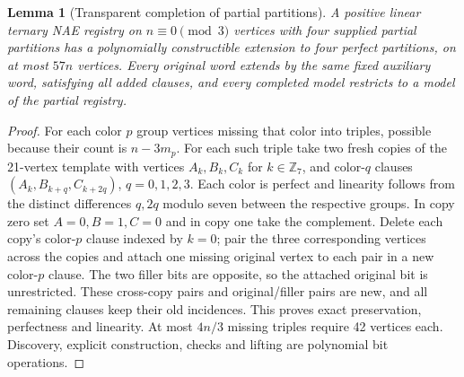 \documentclass[11pt]{article}
\newtheorem{lemma}[theorem]{Lemma}
\begin{document}
\begin{lemma}[Transparent completion of partial partitions]\label{lem:ds16-complete}
A positive linear ternary NAE registry on $n\equiv0\pmod3$ vertices with four supplied partial partitions has a polynomially constructible extension to four perfect partitions, on at most $57n$ vertices. Every original word extends by the same fixed auxiliary word, satisfying all added clauses, and every completed model restricts to a model of the partial registry.
\end{lemma}
\begin{proof}
For each color $p$ group vertices missing that color into triples, possible because their count is $n-3m_p$. For each such triple take two fresh copies of the 21-vertex template with vertices $A_k,B_k,C_k$ for $k\in\mathbb Z_7$, and color-$q$ clauses $(A_k,B_{k+q},C_{k+2q})$, $q=0,1,2,3$. Each color is perfect and linearity follows from the distinct differences $q,2q$ modulo seven between the respective groups. In copy zero set $A=0,B=1,C=0$ and in copy one take the complement. Delete each copy's color-$p$ clause indexed by $k=0$; pair the three corresponding vertices across the copies and attach one missing original vertex to each pair in a new color-$p$ clause. The two filler bits are opposite, so the attached original bit is unrestricted. These cross-copy pairs and original/filler pairs are new, and all remaining clauses keep their old incidences. This proves exact preservation, perfectness and linearity. At most $4n/3$ missing triples require 42 vertices each. Discovery, explicit construction, checks and lifting are polynomial bit operations.
\end{proof}
\end{document}
